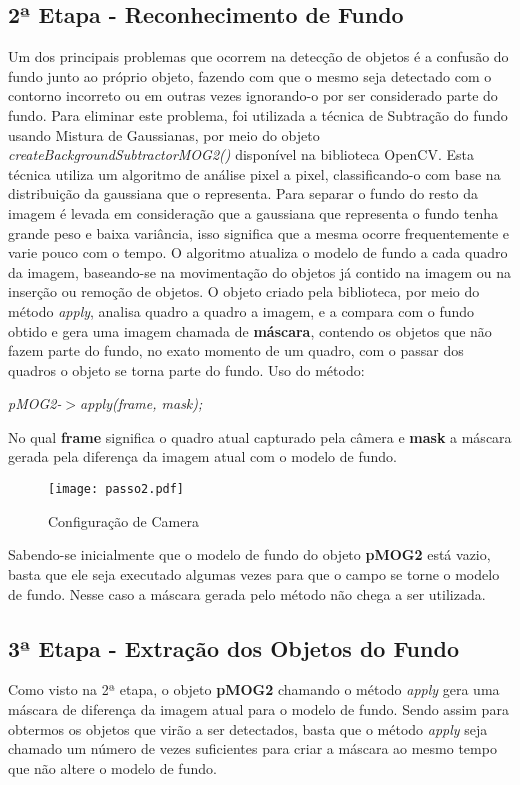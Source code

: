 	\subsection{2ª Etapa - Reconhecimento de Fundo}
	Um dos principais problemas que ocorrem na detecção de objetos é a confusão do fundo junto ao próprio objeto, fazendo com que o mesmo seja detectado com o contorno incorreto ou em outras vezes ignorando-o por ser considerado parte do fundo. Para eliminar este problema, foi utilizada a técnica de Subtração do fundo usando Mistura de Gaussianas, por meio do objeto \textit{createBackgroundSubtractorMOG2()} disponível na biblioteca OpenCV. Esta técnica utiliza um algoritmo de análise pixel a pixel, classificando-o com base na distribuição da gaussiana que o representa. Para separar o fundo do resto da imagem é levada em consideração que a gaussiana que representa o fundo tenha grande peso e baixa variância, isso significa que a mesma ocorre frequentemente e varie pouco com o tempo. O algoritmo atualiza o modelo de fundo a cada quadro da imagem, baseando-se na movimentação do objetos já contido na imagem ou na inserção ou remoção de objetos. O objeto criado pela biblioteca, por meio do método \textit{apply}, analisa quadro a quadro a imagem, e a compara com o fundo obtido e gera uma imagem chamada de \textbf{máscara}, contendo os objetos que não fazem parte do fundo, no exato momento de um quadro, com o passar dos quadros o objeto se torna parte do fundo. Uso do método:
\begin{center}
 \textit{pMOG2-$>$apply(frame, mask);}

\end{center}

No qual \textbf{frame} significa o quadro atual capturado pela câmera e \textbf{mask} a máscara gerada pela diferença da imagem atual com o modelo de fundo. 

\begin{figure}[H]
			\centering
			\texttt{[image: passo2.pdf]}
			\caption{Configuração de Camera}
			\label{Configuracao}
		\end{figure}		


Sabendo-se inicialmente que o modelo de fundo do objeto \textbf{pMOG2} está vazio, basta que ele seja executado algumas vezes para que o campo se torne o modelo de fundo. Nesse caso a máscara gerada pelo método não chega a ser utilizada.
	\subsection{3ª Etapa - Extração dos Objetos do Fundo}
	Como visto na 2ª etapa, o objeto \textbf{pMOG2} chamando o método \textit{apply} gera uma máscara de diferença da imagem atual para o modelo de fundo. Sendo assim para obtermos os objetos que virão a ser detectados, basta que o método \textit{apply} seja chamado um número de vezes suficientes para criar a máscara ao mesmo tempo que não altere o modelo de fundo.
	
